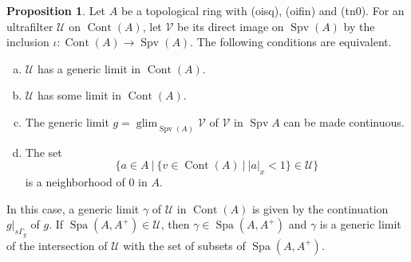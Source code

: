 \documentclass[10pt]{article}
\numberwithin{equation}{section}
\theoremstyle{definition}
\newtheorem{proposition}{Proposition}[subsection]
\DeclareMathOperator{\Spa}{Spa}
\DeclareMathOperator{\glim}{glim}
\DeclareMathOperator{\Spv}{Spv}
\DeclareMathOperator{\Cont}{Cont}
\newcommand{\U}[0]{\mathcal{U}}
\newcommand{\sep}[0]{\:|\:}
\newcommand{\ab}[1]{\vert #1 \vert}
\newcommand{\cV}[0]{\mathcal{V}}
\begin{document}
\begin{proposition}
    \label{proposition_14_4}
    Let $A$ be a topological ring with (oisq), (oifin) and (tn0). For an ultrafilter $\U$ on $\Cont(A)$, let $\cV$ be its direct image on $\Spv(A)$ by the inclusion $\iota:\Cont(A)\to\Spv(A)$. The following conditions are equivalent.
    \begin{enumerate}[a.]
        \item $\U$ has a generic limit in $\Cont(A)$.
        \item $\U$ has some limit in $\Cont(A)$.
        \item The generic limit $g=\glim_{\Spv(A)}\cV$ of $\cV$ in $\Spv A$ can be made continuous.
        \item The set
        \begin{equation}
            \{a\in A\sep \{v\in\Cont(A)\sep \ab{a}_x<1\}\in\U\}
            \label{equation_14_4}
        \end{equation}
        is a neighborhood of $0$ in $A$.
    \end{enumerate}
    In this case, a generic limit $\gamma$ of $\U$ in $\Cont(A)$ is given by the continuation $g|_{s\Gamma_g}$ of $g$. If $\Spa(A,A^+)\in\U$, then $\gamma\in\Spa(A,A^+)$ and $\gamma$ is a generic limit of the intersection of $\U$ with the set of subsets of $\Spa(A,A^+)$.
\end{proposition}
\end{document}
